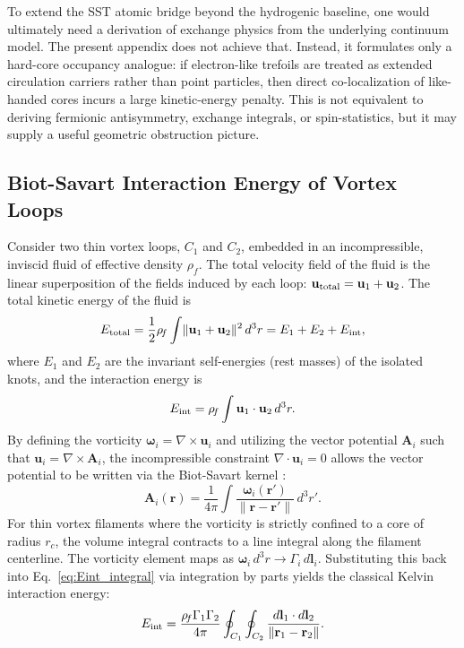 \documentclass[11pt,a4paper]{article}
\begin{document}
    To extend the SST atomic bridge beyond the hydrogenic baseline, one would ultimately need a derivation of exchange physics from the underlying continuum model. The present appendix does not achieve that. Instead, it formulates only a hard-core occupancy analogue: if electron-like trefoils are treated as extended circulation carriers rather than point particles, then direct co-localization of like-handed cores incurs a large kinetic-energy penalty. This is not equivalent to deriving fermionic antisymmetry, exchange integrals, or spin-statistics, but it may supply a useful geometric obstruction picture.
    
    \subsection{Biot-Savart Interaction Energy of Vortex Loops}
        Consider two thin vortex loops, $C_1$ and $C_2$, embedded in an incompressible, inviscid fluid of effective density $\rho_{\!f}$. The total velocity field of the fluid is the linear superposition of the fields induced by each loop: $\mathbf{u}_{\rm total} = \mathbf{u}_1 + \mathbf{u}_2$. The total kinetic energy of the fluid is
        \begin{equation}
            \label{eq:Etotal_fluid}
            E_{\rm total} = \frac{1}{2}\rho_{\!f} \int \lVert \mathbf{u}_1 + \mathbf{u}_2 \rVert^2 \, d^3r
            = E_1 + E_2 + E_{\rm int},
        \end{equation}
        where $E_1$ and $E_2$ are the invariant self-energies (rest masses) of the isolated knots, and the interaction energy is
        \begin{equation}
            \label{eq:Eint_integral}
            E_{\rm int} = \rho_{\!f} \int \mathbf{u}_1 \cdot \mathbf{u}_2 \, d^3r.
        \end{equation}
        By defining the vorticity $\boldsymbol{\omega}_i = \nabla \times \mathbf{u}_i$ and utilizing the vector potential $\mathbf{A}_i$ such that $\mathbf{u}_i = \nabla \times \mathbf{A}_i$, the incompressible constraint $\nabla \cdot \mathbf{u}_i = 0$ allows the vector potential to be written via the Biot-Savart kernel \cite{Batchelor1967}:
        \begin{equation}
            \label{eq:VectorPotential}
            \mathbf{A}_i(\mathbf{r}) = \frac{1}{4\pi} \int \frac{\boldsymbol{\omega}_i(\mathbf{r}')}{\lVert \mathbf{r} - \mathbf{r}' \rVert} \, d^3r'.
        \end{equation}
        For thin vortex filaments where the vorticity is strictly confined to a core of radius $r_c$, the volume integral contracts to a line integral along the filament centerline. The vorticity element maps as $\boldsymbol{\omega}_i \, d^3r \to \Gamma_i \, d\mathbf{l}_i$. Substituting this back into Eq.~\eqref{eq:Eint_integral} via integration by parts yields the classical Kelvin interaction energy:
        \begin{equation}
            \label{eq:BiotSavartEnergy}
            E_{\rm int} = \frac{\rho_{\!f} \Gamma_1 \Gamma_2}{4\pi} \oint_{C_1} \oint_{C_2} \frac{d\mathbf{l}_1 \cdot d\mathbf{l}_2}{\lVert \mathbf{r}_1 - \mathbf{r}_2 \rVert}.
        \end{equation}
    
\end{document}
